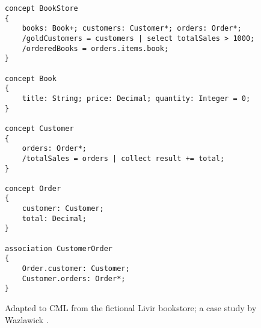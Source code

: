 \begin{figure}
\verbatimfont{\scriptsize}
\begin{verbatim}
concept BookStore
{
    books: Book+; customers: Customer*; orders: Order*;
    /goldCustomers = customers | select totalSales > 1000;
    /orderedBooks = orders.items.book;
}

concept Book
{
    title: String; price: Decimal; quantity: Integer = 0;
}

concept Customer
{
    orders: Order*;
    /totalSales = orders | collect result += total;
}

concept Order
{
    customer: Customer;
    total: Decimal;
}

association CustomerOrder
{
    Order.customer: Customer;
    Customer.orders: Order*;
}
\end{verbatim}
\caption{Adapted to CML from the fictional Livir bookstore; a case study by Wazlawick \cite{wazlawick}.}
\label{fig:store}
\end{figure}
